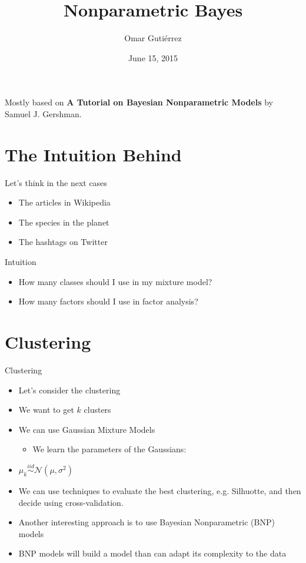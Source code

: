 \documentclass[handout]{beamer}
\title[\insertdate]{Nonparametric Bayes}
\author{Omar Guti\'errez}
\institute{@omargtz}
\date{June 15, 2015}
\begin{document}
\begin{frame}
\titlepage
Mostly based on \textbf{A Tutorial on Bayesian Nonparametric Models} by Samuel J. Gershman.
\end{frame}

\section{The Intuition Behind}
\begin{frame}{Let's think in the next cases}
    \begin{itemize}
        \item The articles in Wikipedia
        \item The species in the planet
        \item The hashtags on Twitter
    \end{itemize}
\end{frame}

\begin{frame}{Intuition}
    \begin{itemize}
        \item How many classes should I use in my mixture model?
        \item How many factors should I use in factor analysis?
    \end{itemize}
\end{frame}

\section{Clustering}
\begin{frame}{Clustering}
	\begin{itemize}
        \item Let's consider the clustering
        \item We want to get $k$ clusters
        \item We can use Gaussian Mixture Models
	        \begin{itemize}
                \item We learn the parameters of the Gaussians:
	        \end{itemize}
        \item $ \mu_{k} \overset{iid}{\sim} \mathcal{N}(\mu, \sigma^{2}) $
        \item We can use techniques to evaluate the best clustering, e.g. Silhuotte, and then decide using cross-validation.
        \item Another interesting approach is to use Bayesian Nonparametric (BNP) models
        \item BNP models will build a model than can adapt its complexity to the data
	\end{itemize}
\end{frame}
\end{document}
